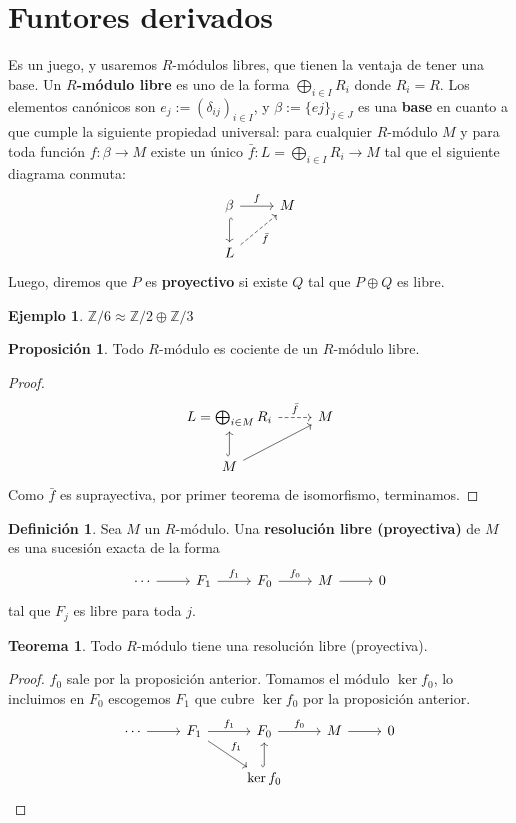 \documentclass[spanish]{book}
\theoremstyle{definition}
\newtheorem*{defn}{Definición}
\newtheorem*{teo}{Teorema}
\newtheorem*{prop}{Proposición}
\newtheorem*{ejem}{Ejemplo}
\newcommand{\Z}{\mathbb{Z}}
\begin{document}
\section{Funtores derivados}
Es un juego, y usaremos $R$-módulos libres, que tienen la ventaja de tener una base. Un \textbf{$R$-módulo libre} es uno de la forma $\bigoplus_{i\in I}R_i$ donde $R_i=R$. Los elementos canónicos son $e_j:=(\delta_{ij})_{i\in I}$, y $\beta:=\{ej\}_{j\in J}$ es una \textbf{base} en cuanto a que cumple la siguiente propiedad universal: para cualquier $R$-módulo $M$ y para toda función $f:\beta\to M$ existe un único $\bar{f}:L=\bigoplus_{i\in I}R_i\to M$ tal que el siguiente diagrama conmuta:
\[\begin{tikzcd}
	\beta\arrow[r,"f"]\arrow[d,hook]&M\\
	L\arrow[ur,swap,dashed,"\bar{f}"]
\end{tikzcd}\]
Luego, diremos que $P$ es \textbf{proyectivo} si existe $Q$ tal que $P\oplus Q$ es libre.
\begin{ejem}
	$\Z/6\approx \Z/2\oplus\Z/3$
\end{ejem}
\begin{prop}
	Todo $R$-módulo es cociente de un $R$-módulo libre. 
\end{prop}
\begin{proof}
	\[\begin{tikzcd}
		L=\bigoplus_{i\in M}R_i\arrow[r,dashed,"\bar{f}"]&M\\
		M\arrow[u,hook]\arrow[ur]
	\end{tikzcd}\]
	Como $\bar{f}$ es suprayectiva, por primer teorema de isomorfismo, terminamos.
\end{proof}
\begin{defn}
	Sea $M$ un $R$-módulo. Una \textbf{resolución libre (proyectiva)} de $M$ es una sucesión exacta de la forma
	\[\begin{tikzcd}
		\cdots\arrow[r]&F_1\arrow[r,"f_1"]&F_0\arrow[r,"f_0"]&M\arrow[r]&0
	\end{tikzcd}\]
	tal que $F_j$ es libre para toda $j$.
\end{defn}
\begin{teo}
	Todo $R$-módulo tiene una resolución libre (proyectiva).
\end{teo}
\begin{proof}
	$f_0$ sale por la proposición anterior. Tomamos el módulo $\ker f_0$, lo incluimos en $F_0$ escogemos $F_1$ que cubre $\ker f_0$ por la proposición anterior.
	\[\begin{tikzcd}
		\cdots\arrow[r]&F_1\arrow[rd,"f_1"]\arrow[r,"f_1"]&F_0\arrow[r,"f_0"]&M\arrow[r]&0\\
		&&\ker f_0\arrow[u,hook]&&
	\end{tikzcd}\]
\end{proof}
\end{document}

